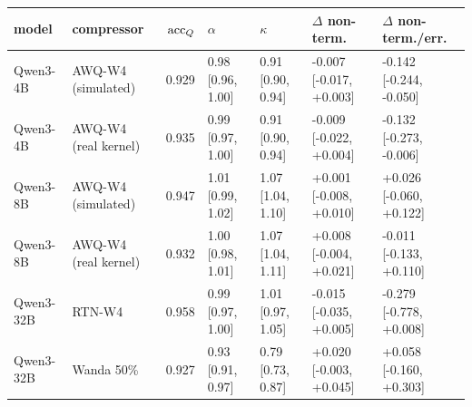 \begin{tabular}{llrllll}
\toprule
model & compressor & $\mathrm{acc}_Q$ & $\alpha$ & $\kappa$ & $\Delta$ non-term. & $\Delta$ non-term./err. \\
\midrule
Qwen3-4B & AWQ-W4 (simulated) & 0.929 & 0.98 [0.96, 1.00] & 0.91 [0.90, 0.94] & -0.007 [-0.017, +0.003] & -0.142 [-0.244, -0.050] \\
Qwen3-4B & AWQ-W4 (real kernel) & 0.935 & 0.99 [0.97, 1.00] & 0.91 [0.90, 0.94] & -0.009 [-0.022, +0.004] & -0.132 [-0.273, -0.006] \\
Qwen3-8B & AWQ-W4 (simulated) & 0.947 & 1.01 [0.99, 1.02] & 1.07 [1.04, 1.10] & +0.001 [-0.008, +0.010] & +0.026 [-0.060, +0.122] \\
Qwen3-8B & AWQ-W4 (real kernel) & 0.932 & 1.00 [0.98, 1.01] & 1.07 [1.04, 1.11] & +0.008 [-0.004, +0.021] & -0.011 [-0.133, +0.110] \\
Qwen3-32B & RTN-W4 & 0.958 & 0.99 [0.97, 1.00] & 1.01 [0.97, 1.05] & -0.015 [-0.035, +0.005] & -0.279 [-0.778, +0.008] \\
Qwen3-32B & Wanda 50\% & 0.927 & 0.93 [0.91, 0.97] & 0.79 [0.73, 0.87] & +0.020 [-0.003, +0.045] & +0.058 [-0.160, +0.303] \\
\bottomrule
\end{tabular}
